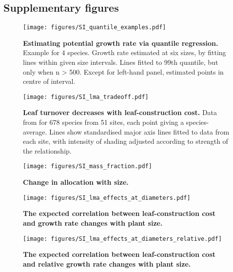 \documentclass[12pt, a4paper]{article}
\makeatletter
\def\maxwidth{\ifdim\Gin@nat@width>\linewidth\linewidth
\else\Gin@nat@width\fi}
\let\Oldincludegraphics\includegraphics
\renewcommand{\includegraphics}[1]{\Oldincludegraphics[width=\maxwidth]{#1}}
\makeatother
\begin{document}
\begin{appendices}
\newpage

\section{Supplementary figures}\label{supplementary-figures}

\begin{figure}[ht]
\centering
\texttt{[image: figures/SI\_quantile\_examples.pdf]}
\caption{\textbf{Estimating potential growth rate via quantile
regression.} Example for 4 species. Growth rate estimated at six sizes,
by fitting lines within given size intervals. Lines fitted to 99th
quantile, but only when n \textgreater{} 500. Except for left-hand
panel, estimated points in centre of interval.
\label{fS-quantile_examples}}
\end{figure}

\newpage

\begin{figure}[ht]
\centering
\texttt{[image: figures/SI\_lma\_tradeoff.pdf]}
\caption{\textbf{Leaf turnover decreases with leaf-construction cost.}
Data from \citep{wright-2004} for 678 species from 51 sites, each
point giving a species-average. Lines show standardised major axis lines
fitted to data from each site, with intensity of shading adjusted
according to strength of the relationship.\label{fS-leaf}}
\end{figure}


\newpage

\begin{figure}[ht]
\centering
\texttt{[image: figures/SI\_mass\_fraction.pdf]}
\caption{\textbf{Change in allocation with size.}
\label{f-mass_fraction}}
\end{figure}

\newpage

\begin{figure}[ht]
\centering
\texttt{[image: figures/SI\_lma\_effects\_at\_diameters.pdf]}
\caption{\textbf{The expected correlation between leaf-construction cost
and growth rate changes with plant size.} \label{f-lma_growth_size}}
\end{figure}

\begin{figure}[ht]
\centering
\texttt{[image: figures/SI\_lma\_effects\_at\_diameters\_relative.pdf]}
\caption{\textbf{The expected correlation between leaf-construction cost
and relative growth rate changes with plant size.}
\label{f-lma_growth_size_relative}}
\end{figure}


\end{appendices}
\end{document}
